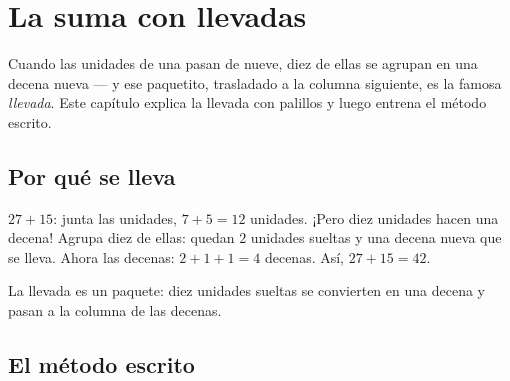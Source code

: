 \chapter{La suma con llevadas}\label{ch:g2:addition}

Cuando las unidades de una  pasan de nueve, diez de ellas se agrupan
en una decena nueva --- y ese paquetito, trasladado a la columna siguiente, es
la famosa \emph{llevada}. Este capítulo explica la llevada con palillos
y luego entrena el método escrito.

\section{Por qué se lleva}

\begin{example}\label{ex:g2:addition:bundle}
$27 + 15$: junta las unidades, $7 + 5 = 12$ unidades. ¡Pero diez
unidades hacen una decena! Agrupa diez de ellas: quedan $2$ unidades sueltas
y una decena nueva que se lleva. Ahora las decenas: $2 + 1 + 1 = 4$ decenas. Así,
$27 + 15 = 42$.
\end{example}

\begin{omfigure}

{\small La llevada es un paquete: diez unidades sueltas se convierten en una decena
y pasan a la columna de las decenas.}
\end{omfigure}

\section{El método escrito}


